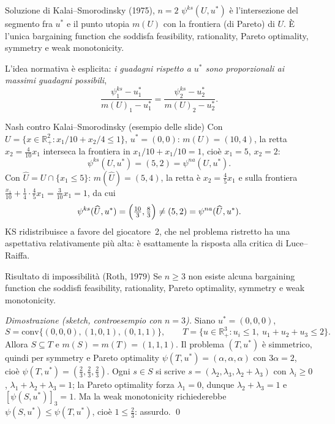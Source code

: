 \documentclass[12pt,a4paper,twoside]{book}
\theoremstyle{plain}
\theoremstyle{definition}
\begin{document}
\begin{thmbox}{Soluzione di Kalai--Smorodinsky (1975), $n=2$}
$\psi^{ks}(U,u^*)$ è l'intersezione del segmento fra $u^*$ e il punto utopia $m(U)$ con la
frontiera (di Pareto) di $U$. È l'unica bargaining function che soddisfa feasibility,
rationality, Pareto optimality, symmetry e weak monotonicity.
\end{thmbox}

L'idea normativa è esplicita: \emph{i guadagni rispetto a $u^*$ sono proporzionali ai
massimi guadagni possibili},
\[
  \frac{\psi^{ks}_1-u^*_1}{m(U)_1-u^*_1}=\frac{\psi^{ks}_2-u^*_2}{m(U)_2-u^*_2}.
\]

\begin{exbox}{Nash contro Kalai--Smorodinsky (esempio delle slide)}
Con $U=\{x\in\mathbb{R}^2_+ : x_1/10+x_2/4\le1\}$, $u^*=(0,0)$: $m(U)=(10,4)$, la retta
$x_2=\tfrac{4}{10}x_1$ interseca la frontiera in $x_1/10+x_1/10=1$, cioè $x_1=5$, $x_2=2$:
\[
  \psi^{ks}(U,u^*)=(5,2)=\psi^{na}(U,u^*).
\]
Con $\widehat U=U\cap\{x_1\le5\}$: $m(\widehat U)=(5,4)$, la retta è $x_2=\tfrac45x_1$ e
sulla frontiera $\tfrac{x_1}{10}+\tfrac{1}{4}\cdot\tfrac45x_1=\tfrac{3}{10}x_1=1$, da cui
\[
  \psi^{ks}(\widehat U,u^*)=\Bigl(\tfrac{10}{3},\tfrac{8}{3}\Bigr)\ne(5,2)=\psi^{na}(\widehat U,u^*).
\]
KS ridistribuisce a favore del giocatore~2, che nel problema ristretto ha una aspettativa
relativamente più alta: è esattamente la risposta alla critica di Luce--Raiffa.
\end{exbox}

\begin{thmbox}{Risultato di impossibilità (Roth, 1979)}
Se $n\ge3$ non esiste alcuna bargaining function che soddisfi feasibility, rationality,
Pareto optimality, symmetry e weak monotonicity.
\end{thmbox}

\textit{Dimostrazione (sketch, controesempio con $n=3$).} Siano $u^*=(0,0,0)$,
\[
  S=\mathrm{conv}\{(0,0,0),(1,0,1),(0,1,1)\},\qquad
  T=\{u\in\mathbb{R}^3_+ : u_i\le1,\ u_1+u_2+u_3\le2\}.
\]
Allora $S\subseteq T$ e $m(S)=m(T)=(1,1,1)$. Il problema $(T,u^*)$ è simmetrico, quindi per
symmetry e Pareto optimality $\psi(T,u^*)=(\alpha,\alpha,\alpha)$ con $3\alpha=2$, cioè
$\psi(T,u^*)=(\tfrac23,\tfrac23,\tfrac23)$. Ogni $s\in S$ si scrive
$s=(\lambda_2,\lambda_3,\lambda_2+\lambda_3)$ con $\lambda_i\ge0$,
$\lambda_1+\lambda_2+\lambda_3=1$; la Pareto optimality forza $\lambda_1=0$, dunque
$\lambda_2+\lambda_3=1$ e $[\psi(S,u^*)]_3=1$. Ma la weak monotonicity richiederebbe
$\psi(S,u^*)\le\psi(T,u^*)$, cioè $1\le\tfrac23$: assurdo. \qed
\end{document}
